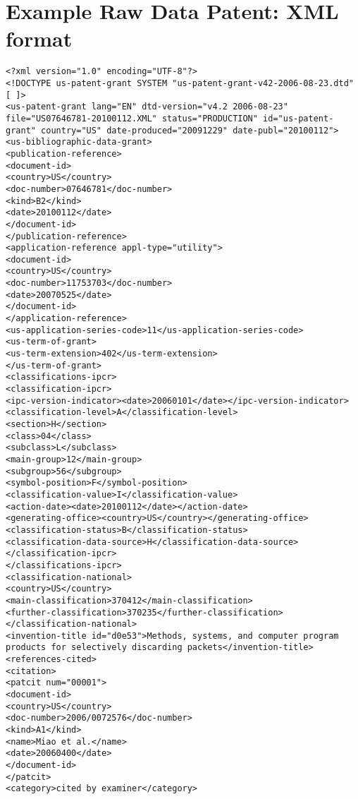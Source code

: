 
\chapter{Example Raw Data Patent: XML format} %

\label{AppendixD} %

\tiny 

\begin{lstlisting}
<?xml version="1.0" encoding="UTF-8"?>
<!DOCTYPE us-patent-grant SYSTEM "us-patent-grant-v42-2006-08-23.dtd" [ ]>
<us-patent-grant lang="EN" dtd-version="v4.2 2006-08-23" file="US07646781-20100112.XML" status="PRODUCTION" id="us-patent-grant" country="US" date-produced="20091229" date-publ="20100112">
<us-bibliographic-data-grant>
<publication-reference>
<document-id>
<country>US</country>
<doc-number>07646781</doc-number>
<kind>B2</kind>
<date>20100112</date>
</document-id>
</publication-reference>
<application-reference appl-type="utility">
<document-id>
<country>US</country>
<doc-number>11753703</doc-number>
<date>20070525</date>
</document-id>
</application-reference>
<us-application-series-code>11</us-application-series-code>
<us-term-of-grant>
<us-term-extension>402</us-term-extension>
</us-term-of-grant>
<classifications-ipcr>
<classification-ipcr>
<ipc-version-indicator><date>20060101</date></ipc-version-indicator>
<classification-level>A</classification-level>
<section>H</section>
<class>04</class>
<subclass>L</subclass>
<main-group>12</main-group>
<subgroup>56</subgroup>
<symbol-position>F</symbol-position>
<classification-value>I</classification-value>
<action-date><date>20100112</date></action-date>
<generating-office><country>US</country></generating-office>
<classification-status>B</classification-status>
<classification-data-source>H</classification-data-source>
</classification-ipcr>
</classifications-ipcr>
<classification-national>
<country>US</country>
<main-classification>370412</main-classification>
<further-classification>370235</further-classification>
</classification-national>
<invention-title id="d0e53">Methods, systems, and computer program products for selectively discarding packets</invention-title>
<references-cited>
<citation>
<patcit num="00001">
<document-id>
<country>US</country>
<doc-number>2006/0072576</doc-number>
<kind>A1</kind>
<name>Miao et al.</name>
<date>20060400</date>
</document-id>
</patcit>
<category>cited by examiner</category>

\end{lstlisting}
